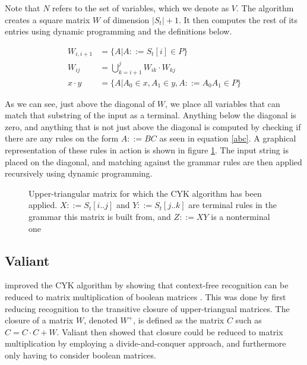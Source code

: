 \documentclass[a4paper,12pt,twosided]{report}
\renewcommand\cite{\citep}
\newcommand{\subt}[3] { 
  \draw[grid] (#1,#1) -- (#1,#2) node[inChart] {#3} -- (#2,#2);
  \fill[color=black] (#1,#2) circle (2pt)
 }
\newcommand{\mrk}[2]{\node[inChart] at (#1,#1) {#2}}
\begin{document}
Note that $N$ refers to the set of variables, which we denote as $V$. The
algorithm creates a square matrix $W$ of dimension $|S_t|+1$.  It then computes
the rest of its entries using dynamic programming and the definitions below.

\begin{align}
W_{i,i+1} &= \{ A | A ::= S_t[i] \in P \} \\
W_{ij}    &= \bigcup_{k=i+1}^{j} W_{ik} \cdot W_{kj} \\
x \cdot y &= \{ A | A_0 \in x, A_1 \in y, A ::= A_0A_1 \in P \} \label{abc}
\end{align}

As we can see, just above the diagonal of $W$, we place all variables that can
match that substring of the input as a terminal. Anything below the diagonal is
zero, and anything that is not just above the diagonal is computed by checking
if there are any rules on the form $A ::= BC$ as seen in equation \ref{abc}. A
graphical representation of these rules in action is shown in figure
\ref{exchart}. The input string is placed on the diagonal, and matching against
the grammar rules are then applied recursively using dynamic programming. 

\begin{figure}[H]
  \centering
  \caption{\label{exchart}Upper-triangular matrix for which the CYK algorithm
           has been applied. $X ::= S_t[i..j]$ and $Y ::= S_t[j..k]$ are
           terminal rules in the grammar this matrix is built from, and $Z
           ::= XY$ is a nonterminal one} 
\end{figure}

\subsection{Valiant}
\citeauthor{Valiant75} improved the CYK algorithm by showing that
context-free recognition can be reduced to matrix multiplication of boolean
matrices \cite{Valiant75}. This was done by first reducing recognition to the
transitive closure of upper-triangual matrices.  The closure of a matrix $W$,
denoted $W^+$, is defined as the matrix $C$ such as $C = C \cdot C + W$.
Valiant then showed that closure could be reduced to matrix multiplication by
employing a divide-and-conquer approach, and furthermore only having to consider
boolean matrices. 
\end{document}

